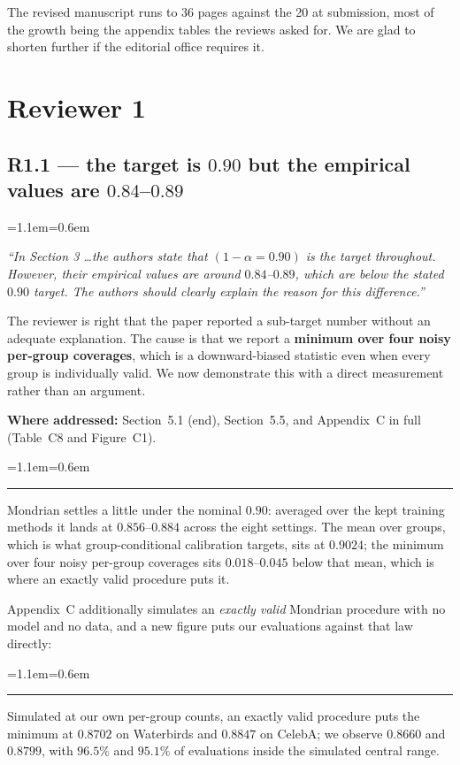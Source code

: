 \documentclass[11pt,a4paper]{article}
\newenvironment{reviewer}
  {\begin{list}{}{\leftmargin=1.1em\rightmargin=0.6em}\item[]\itshape\color{revgrey}\small}
  {\end{list}}
\newenvironment{revised}
  {\begin{list}{}{\leftmargin=1.1em\rightmargin=0.6em}\item[]%
   \color{black}\small\hspace{-1.1em}\textcolor{quoterule}{\rule[-0.4ex]{2pt}{1.05em}}\hspace{0.5em}\ignorespaces}
  {\end{list}}
\newcommand{\where}[1]{{\textbf{Where addressed:} #1\par}}
\newcommand{\rpoint}[2]{\subsection*{#1 --- #2}}
\begin{document}
The revised manuscript runs to 36 pages against the 20 at submission, most of the growth being the
appendix tables the reviews asked for. We are glad to shorten further if the editorial office
requires it.

\section*{Reviewer 1}

\rpoint{R1.1}{the target is $0.90$ but the empirical values are $0.84$--$0.89$}

\begin{reviewer}
``In Section 3 \ldots the authors state that $(1-\alpha=0.90)$ is the target throughout. However,
their empirical values are around $0.84$--$0.89$, which are below the stated $0.90$ target. The
authors should clearly explain the reason for this difference.''
\end{reviewer}

The reviewer is right that the paper reported a sub-target number without an adequate explanation.
The cause is that we report a \textbf{minimum over four noisy per-group coverages}, which is a
downward-biased statistic even when every group is individually valid. We now demonstrate this with
a direct measurement rather than an argument.

\where{Section~5.1 (end), Section~5.5, and Appendix~C in full (Table~C8 and Figure~C1).}

\begin{revised}
Mondrian settles a little under the nominal $0.90$: averaged over the kept training
methods it lands at $0.856$--$0.884$ across the eight settings. The mean over
groups, which is what group-conditional calibration targets, sits at $0.9024$; the minimum over
four noisy per-group coverages sits $0.018$--$0.045$ below that mean, which is where an exactly valid procedure puts it.
\end{revised}

Appendix~C additionally simulates an \emph{exactly valid} Mondrian procedure with no model and no
data, and a new figure puts our evaluations against that law directly:

\begin{revised}
Simulated at our own per-group counts, an exactly valid procedure puts the minimum at
$0.8702$ on Waterbirds and $0.8847$ on CelebA; we observe $0.8660$ and $0.8799$, with $96.5\%$ and
$95.1\%$ of evaluations inside the simulated central range.
\end{revised}
\end{document}

